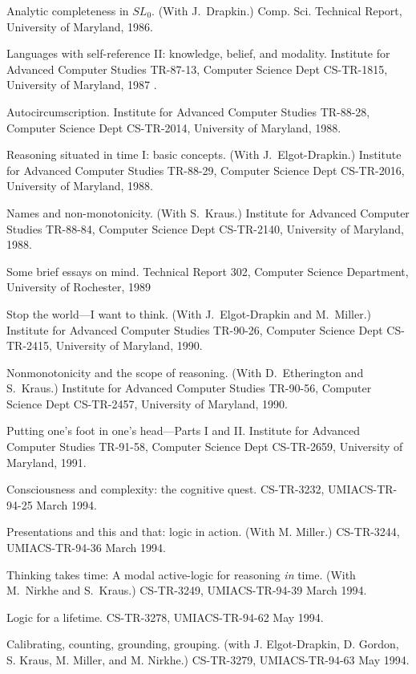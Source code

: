 {\paper
Analytic completeness in $SL_0$.
(With J.~Drapkin.)
Comp. Sci. Technical Report,
University of Maryland, 1986.

\paper
Languages with self-reference II: knowledge, belief, and modality.
Institute for Advanced Computer Studies TR-87-13,
Computer Science Dept CS-TR-1815,
University of Maryland, 1987
.

\paper
Autocircumscription.
Institute for Advanced Computer Studies TR-88-28,
Computer Science Dept CS-TR-2014,
University of Maryland, 1988.

\paper
Reasoning situated in time I: basic concepts.
(With J.~Elgot-Drapkin.)
Institute for Advanced Computer Studies TR-88-29,
Computer Science Dept CS-TR-2016,
University of Maryland, 1988.

\paper
Names and non-monotonicity.
(With S.~Kraus.)
Institute for Advanced Computer Studies TR-88-84,
Computer Science Dept CS-TR-2140,
University of Maryland, 1988.

\paper
Some brief essays on mind.
Technical Report 302,
Computer Science Department,
University of Rochester, 1989

\paper
Stop the world---I want to think.
(With J.~Elgot-Drapkin and M.~Miller.)
Institute for Advanced Computer Studies TR-90-26,
Computer Science Dept CS-TR-2415,
University of Maryland, 1990.

\paper
Nonmonotonicity and the scope of reasoning.
(With D.~Etherington and S.~Kraus.)
Institute for Advanced Computer Studies TR-90-56,
Computer Science Dept CS-TR-2457,
University of Maryland, 1990.

\paper
Putting one's foot in one's head---Parts I and II.
Institute for Advanced Computer Studies TR-91-58,
Computer Science Dept CS-TR-2659,
University of Maryland, 1991.

\paper
Consciousness and complexity: the cognitive quest.
CS-TR-3232, UMIACS-TR-94-25
March 1994.

\paper
Presentations and this and that: logic in action.
(With M. Miller.)
CS-TR-3244, UMIACS-TR-94-36
March 1994.

\paper
Thinking takes time: A modal active-logic for reasoning {\sl in} time.
(With M.~Nirkhe and S.~Kraus.) 
CS-TR-3249, UMIACS-TR-94-39
March 1994.

\paper
Logic for a lifetime.
CS-TR-3278, UMIACS-TR-94-62
May 1994.

\paper
Calibrating, counting, grounding, grouping.
(with J. Elgot-Drapkin, D. Gordon, S. Kraus, M. Miller, and M.
Nirkhe.)
CS-TR-3279, UMIACS-TR-94-63
May 1994.

}
